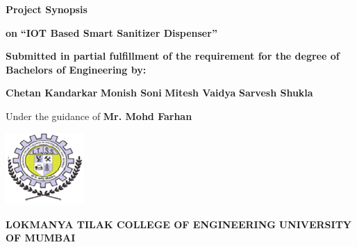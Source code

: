 
 \begin{center}
	\textbf{ Project Synopsis}
	
	\textbf {on}
	\LARGE  \linebreak \textbf  {\textquotedblleft IOT Based Smart Sanitizer Dispenser\textquotedblright}
	
\end{center}
\vspace{0.5cm}

\begin{center}
	
	\textbf {Submitted in partial fulfillment of the requirement for the degree of}
	\vspace{0.2cm}
	\linebreak \textbf {Bachelors of Engineering by:}
	
\end{center}
\vspace{0.2cm}
\begin{center}
	
	\textbf{Chetan Kandarkar}
	\linebreak \textbf{Monish Soni}
	\linebreak \textbf{Mitesh Vaidya}
	\linebreak \textbf{Sarvesh Shukla}
	\vspace{1cm}
	
	Under the guidance of
	\linebreak \textbf{Mr. Mohd Farhan}
\end{center} 
\begin{center}
	\includegraphics[width=30mm,scale=1]{11}
\end{center}

\begin{center}
	\vspace{0.5cm}
	
	\textbf{LOKMANYA TILAK COLLEGE OF ENGINEERING}
	\vspace{0.2cm}
	\vspace{0.2cm}
	\linebreak  \textbf {UNIVERSITY OF MUMBAI}
\end{center}
\vspace{0.2cm} 


